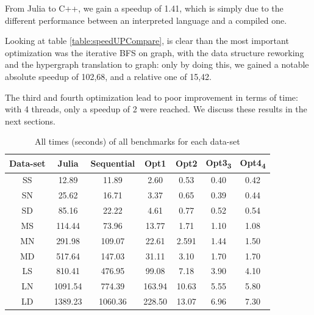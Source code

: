 \documentclass[conference]{IEEEtran}
\begin{document}
From Julia to C++, we gain a speedup of 1.41, which is simply due to the different performance between an interpreted language and a compiled one. 

Looking at table \ref{table:speedUPCompare}, is clear than the most important optimization was the iterative BFS on graph, with the data structure reworking and the hypergraph translation to graph: only by doing this, we gained a notable absolute speedup of 102,68, and a relative one of 15,42.

The third and fourth optimization lead to poor improvement in terms of time: with 4 threads, only a speedup of 2 were reached. We discuss these results in the next sections.

\begin{table}[h!]
\caption{All times (seconds) of all benchmarks for each data-set}
\renewcommand{\arraystretch}{1.3}
\label{table:all_results}
    \vspace*{-7mm}
    \begin{center}
         \begin{tabular}{| c ||c c c c c c |} 
         \hline
         \bfseries Data-set & \bfseries Julia & \bfseries Sequential & \bfseries Opt1 & \bfseries Opt2 & \bfseries Opt3\textsubscript{3} & \bfseries Opt4\textsubscript{4} \\
         \hline
         SS & 12.89 & 11.89 & 2.60 & 0.53 & 0.40 & 0.42 \\ 
         \hline
         SN & 25.62 & 16.71 & 3.37 & 0.65 & 0.39  & 0.44 \\ 
         \hline
         SD & 85.16 & 22.22 & 4.61 & 0.77 & 0.52 & 0.54 \\ 
         \hline
         MS & 114.44 & 73.96 & 13.77 & 1.71 & 1.10 & 1.08 \\ 
         \hline
         MN & 291.98 & 109.07 & 22.61 & 2.591 & 1.44 & 1.50 \\   
         \hline
         MD & 517.64 & 147.03 & 31.11 & 3.10 & 1.70 & 1.70 \\   
         \hline
         LS & 810.41 & 476.95 & 99.08 & 7.18 & 3.90 & 4.10 \\   
         \hline
         LN & 1091.54 & 774.39 & 163.94 & 10.63 & 5.55 & 5.80 \\   
         \hline
         LD & 1389.23 & 1060.36 & 228.50 & 13.07 & 6.96 & 7.30 \\   
         \hline
        \end{tabular}
    \end{center}
\end{table}
\end{document}
